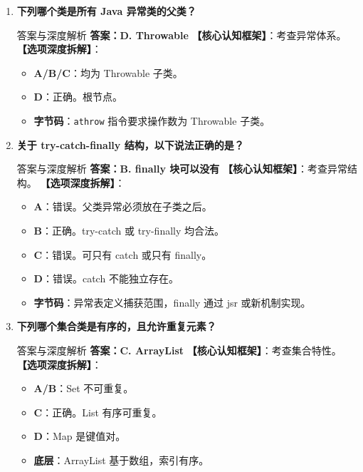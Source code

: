 \documentclass[12pt, a4paper]{ctexart}
\newcommand{\code}[1]{\texttt{\color{myblue}#1}}
\begin{document}
\begin{enumerate}[label=\arabic*.]
\item \textbf{下列哪个类是所有 Java 异常类的父类？}
\begin{bluebox}{答案与深度解析}
\textbf{答案：D. Throwable}
\textbf{【核心认知框架】}：考查异常体系。
\textbf{【选项深度拆解】}：
\begin{itemize}[leftmargin=*, nosep]
    \item \textbf{A/B/C}：均为 Throwable 子类。
    \item \textbf{D}：正确。根节点。
    \item \textbf{字节码}：\code{athrow} 指令要求操作数为 Throwable 子类。
\end{itemize}
\end{bluebox}

\item \textbf{关于 try-catch-finally 结构，以下说法正确的是？}
\begin{bluebox}{答案与深度解析}
\textbf{答案：B. finally 块可以没有}
\textbf{【核心认知框架】}：考查异常结构。
\textbf{【选项深度拆解】}：
\begin{itemize}[leftmargin=*, nosep]
    \item \textbf{A}：错误。父类异常必须放在子类之后。
    \item \textbf{B}：正确。try-catch 或 try-finally 均合法。
    \item \textbf{C}：错误。可只有 catch 或只有 finally。
    \item \textbf{D}：错误。catch 不能独立存在。
    \item \textbf{字节码}：异常表定义捕获范围，finally 通过 jsr 或新机制实现。
\end{itemize}
\end{bluebox}

\item \textbf{下列哪个集合类是有序的，且允许重复元素？}
\begin{bluebox}{答案与深度解析}
\textbf{答案：C. ArrayList}
\textbf{【核心认知框架】}：考查集合特性。
\textbf{【选项深度拆解】}：
\begin{itemize}[leftmargin=*, nosep]
    \item \textbf{A/B}：Set 不可重复。
    \item \textbf{C}：正确。List 有序可重复。
    \item \textbf{D}：Map 是键值对。
    \item \textbf{底层}：ArrayList 基于数组，索引有序。
\end{itemize}
\end{bluebox}


\end{enumerate}
\end{document}
